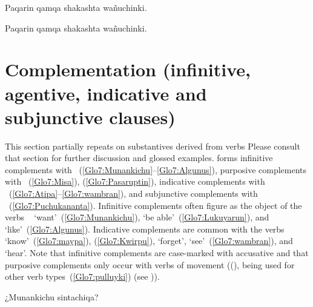 %
{Paqarin qamqa shakashta wañuchinki.~\updag}%
{}%
{}{}%

%
{Paqarin qamqa shakashta wañuchinki.~\updag}%
{}%
{}{}%
 
\section{Complementation (infinitive, agentive, indicative and subjunctive clauses)}\label{sec:comple} 
This section partially repeats  on substantives derived from verbs Please consult that section for further discussion and glossed examples. \SYQ{} forms infinitive complements with ~(\ref{Glo7:Munankichu}--\ref{Glo7:Algunus}), purposive complements with ~(\ref{Glo7:Misa}), (\ref{Glo7:Pasaruptin}), indicative complements with ~(\ref{Glo7:Atipa}--\ref{Glo7:wambran}), and subjunctive complements with ~(\ref{Glo7:Puchukananta}). Infinitive complements often figure as the object of the verbs ~ ‘want’~(\ref{Glo7:Munankichu}),  ‘be able’~(\ref{Glo7:Lukuyarun}), and  ‘like’~(\ref{Glo7:Algunus}). Indicative complements are common with the verbs  ‘know’~(\ref{Glo7:maypa}), (\ref{Glo7:Kwirpu}),  ‘forget’,  ‘see’~(\ref{Glo7:wambran}), and  ‘hear’. Note that infinitive complements are case-marked with accusative  and that  purposive complements only occur with verbs of movement ((), being used for other verb types~(\ref{Glo7:pulluyki}) (see )).


%
{¿Munankichu sintachiqa?}%
{}%
{}{}%

